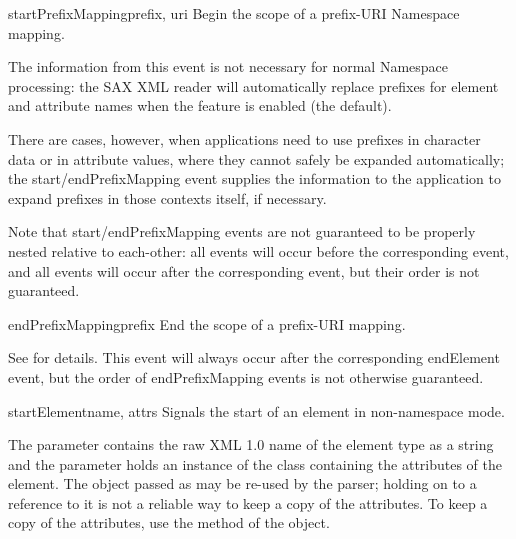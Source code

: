 \begin{methoddesc}[ContentHandler]{startPrefixMapping}{prefix, uri}
  Begin the scope of a prefix-URI Namespace mapping.
        
  The information from this event is not necessary for normal
  Namespace processing: the SAX XML reader will automatically replace
  prefixes for element and attribute names when the
   feature is enabled (the default).

  
  There are cases, however, when applications need to use prefixes in
  character data or in attribute values, where they cannot safely be
  expanded automatically; the start/endPrefixMapping event supplies
  the information to the application to expand prefixes in those
  contexts itself, if necessary.
  
  Note that start/endPrefixMapping events are not guaranteed to be
  properly nested relative to each-other: all
   events will occur before the
  corresponding  event, and all
   events will occur after the
  corresponding  event, but their order is not
  guaranteed.
\end{methoddesc}

\begin{methoddesc}[ContentHandler]{endPrefixMapping}{prefix}
  End the scope of a prefix-URI mapping.
        
  See  for details. This event will always
  occur after the corresponding endElement event, but the order of
  endPrefixMapping events is not otherwise guaranteed.
\end{methoddesc}

\begin{methoddesc}[ContentHandler]{startElement}{name, attrs}
  Signals the start of an element in non-namespace mode.

  The  parameter contains the raw XML 1.0 name of the
  element type as a string and the  parameter holds an
  instance of the  class containing the attributes
  of the element.  The object passed as  may be re-used by
  the parser; holding on to a reference to it is not a reliable way to
  keep a copy of the attributes.  To keep a copy of the attributes,
  use the  method of the  object.
\end{methoddesc}

